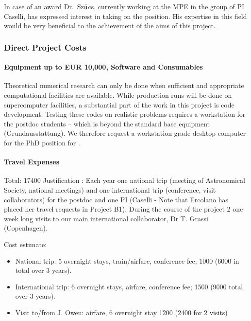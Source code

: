 \documentclass[10pt,fleqn,twoside]{article}
\begin{document}
In case of an award Dr.\ Sz$\ddot{\textsf u}$cs, currently working at
the MPE in the group of PI Caselli, has expressed interest in taking on the position. His expertise in this field would be very beneficial to the achievement of the aims of this project.

\subsubsection{Direct Project Costs}


\paragraph{Equipment up to EUR 10,000, Software and Consumables}

Theoretical numerical research can only be done when sufficient and
appropriate computational facilities are available. While production
runs will be done on supercomputer facilities, a substantial part of
the work in this project is code development. Testing these codes on
realistic problems requires a workstation for the postdoc
students -- which is beyond the standard base equipment
(Grundausstattung). We therefore request a workstation-grade desktop
computer for the PhD position for .

\paragraph{Travel Expenses}

Total: 17400 \EUR{} Justification : 
Each year one national trip (meeting of Astronomical Society, national
meetings) and one international trip (conference, visit
collaborators) for the postdoc and one PI (Caselli - Note that Ercolano has
placed her travel requests in Project B1). 
During the course of the project 2 one week long visits to our main
international collaborator, Dr T. Grassi (Copenhagen). 

Cost estimate: 
\begin{itemize}
\item National trip: 5 overnight stays, train/airfare,
conference fee; 1000 \EUR{} (6000 in total over 3 years).
\item International trip: 6 overnight stays, airfare, conference fee;
  1500 \EUR{} (9000 total over 3 years).
\item Visit to/from J. Owen: airfare, 6 overnight stay 1200 \EUR{} (2400
  for 2 visits)
\end{itemize}
\end{document}
